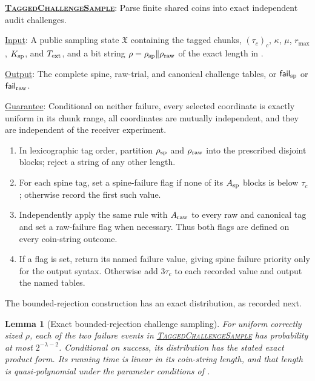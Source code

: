 \documentclass[11pt]{article}
\newenvironment{fminipage}%
  {\begin{Sbox}\begin{minipage}}%
  {\end{minipage}\end{Sbox}\fbox{\TheSbox}}
\newenvironment{algbox}[0]{%
\vskip 0.2in
\noindent
\begin{fminipage}{6.3in}
}{%
\end{fminipage}
\vskip 0.2in
}
\newtheorem{lemma}{Lemma}[section]
\begin{document}
\begin{algbox}
\textbf{\uline{\textsc{TaggedChallengeSample}}}: Parse finite shared coins
into exact independent audit challenges.
\label{alg:challenge-sample}

\uline{Input}: A public sampling state $\mathfrak X$ containing the tagged
chunks, $(\tau_c)_c$, $\kappa$, $\mu$, $r_{\max}$, $K_{\rm sp}$, and
$T_{\rm ext}$, and a bit string $\rho=\rho_{\rm sp}\Vert\rho_{\rm raw}$ of
the exact length in .

\uline{Output}: The complete spine, raw-trial, and canonical challenge tables,
or $\mathsf{fail}_{\rm sp}$ or $\mathsf{fail}_{\rm raw}$.

\uline{Guarantee}: Conditional on neither failure, every selected coordinate
is exactly uniform in its chunk range, all coordinates are mutually
independent, and they are independent of the receiver experiment.

\begin{enumerate}[leftmargin=*,label=\arabic*.]
 \item In lexicographic tag order, partition $\rho_{\rm sp}$ and
 $\rho_{\rm raw}$ into the prescribed disjoint blocks; reject a string of any
 other length.
 \item For each spine tag, set a spine-failure flag if none of its
 $A_{\rm sp}$ blocks is below $\tau_c$; otherwise record the first such value.
 \item Independently apply the same rule with $A_{\rm raw}$ to every raw and
 canonical tag and set a raw-failure flag when necessary.  Thus both flags are
 defined on every coin-string outcome.
 \item If a flag is set, return its named failure value, giving spine failure
 priority only for the output syntax.  Otherwise add $3\tau_c$ to each
 recorded value and output the named tables.
\end{enumerate}
\end{algbox}

The bounded-rejection construction has an exact distribution, as recorded
next.

\begin{lemma}[Exact bounded-rejection challenge sampling]
\label{lem:challenge-sampling}
For uniform correctly sized $\rho$, each of the two failure events in
\hyperref[alg:challenge-sample]{\textsc{TaggedChallengeSample}} has probability
at most $2^{-\lambda-2}$.  Conditional on success, its distribution has the
stated exact product form.  Its running time is linear in its coin-string
length, and that length is quasi-polynomial under the parameter conditions of
.
\end{lemma}
\end{document}
